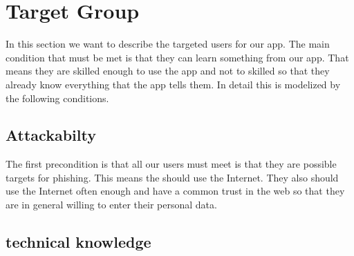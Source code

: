 \section{Target Group}
\label{s:target_group}
In this section we want to describe the targeted users for our app.
The main condition that must be met is that they can learn something from our app.
That means they are skilled enough to use the app and not to skilled so that they already know everything that the app tells them.
In detail this is modelized by the following conditions.
\subsection{Attackabilty}
The first precondition is that all our users must meet is that they are possible targets for phishing.
This means the should use the Internet.
They also should use the Internet often enough and have a common trust in the web so that they are in general willing to enter their personal data.

\subsection{technical knowledge}
